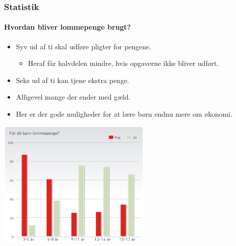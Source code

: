 
\begin{frame}
\frametitle{Statistik}
\framesubtitle{Hvordan bliver lommepenge brugt?} %

    \begin{multicols}{2}
  \noindent
	 	 \begin{itemize}
        	\item{Syv ud af ti skal udføre pligter for pengene.}
        		\begin{itemize}
        			\item Heraf får halvdelen mindre, hvis opgaverne ikke bliver udført.
        		\end{itemize}
        	\item{Seks ud af ti kan tjene ekstra penge.}
        	\item{Alligevel mange der ender med gæld.}
        	\item{Her er der gode muligheder for at lære børn endnu mere om økonomi.}
    	\end{itemize}
 	\columnbreak
 	    \noindent
 	\includegraphics[width=0.55\textwidth]{../../Billeder/FaarBarnLommepenge.png}
    \end{multicols}
\end{frame}
    
